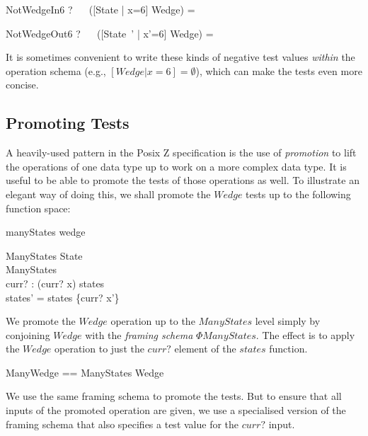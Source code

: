 \documentclass{llncs}
\begin{document}
\begin{theorem}{NotWedgeIn6}
\vdash? ~~ ([State | x=6] \land Wedge) = \emptyset
\end{theorem}

\begin{theorem}{NotWedgeOut6}
\vdash? ~~ ([State~' | x'=6] \land Wedge) = \emptyset
\end{theorem}

It is sometimes convenient to write these kinds of negative test values
\emph{within} the operation schema (e.g., $[Wedge | x=6] = \emptyset$),
which can make the tests even more concise.


\subsection{Promoting Tests}

A heavily-used pattern in the Posix Z specification is the use of
\emph{promotion} to lift the operations of one data type up to work on a
more complex data type.  It is useful to be able to promote the tests
of those operations as well.  To illustrate an elegant way of doing this,
we shall promote the $Wedge$ tests up to the following function space:

\begin{zsection}
  \SECTION manyStates \parents wedge
\end{zsection}


\begin{schema}{\Phi ManyStates}
  \Delta State \\
  \Delta ManyStates \\
  curr? : \nat
\where
  (curr? \mapsto x) \in states \\
  states' = states \oplus \{curr? \mapsto x'\}
\end{schema}

We promote the $Wedge$ operation up to the $ManyStates$ level simply by
conjoining $Wedge$ with the \emph{framing schema} $\Phi ManyStates$.
The effect is to apply the $Wedge$ operation to just the $curr?$ element of
the $states$ function. 

\begin{zed}
  ManyWedge == \Phi ManyStates \land Wedge
\end{zed}


We use the same framing schema to promote the tests.  But to ensure that
all inputs of the promoted operation are given, we use a specialised
version of the framing schema that also specifies a test value for the
$curr?$ input.
\end{document}
